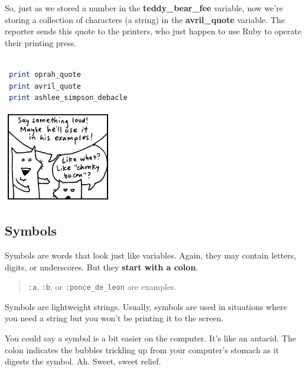 \documentclass[10pt,twoside]{report}
\begin{document}
So, just as we stored a number in the {\bf teddy\_bear\_fee} variable,
now we're storing a collection of characters (a string) in the {\bf
  avril\_quote} variable.  The reporter sends this quote to the
printers, who just happen to use Ruby to operate their printing press.


\begin{lstlisting}[basicstyle=\ttfamily\color{basiccolor},
    commentstyle = \ttfamily\color{commentcolor},
    keywordstyle=\ttfamily\color{keywordscolor},
    stringstyle=\color{stringcolor},
    language=Ruby,
    basicstyle=\small\ttfamily,
    showstringspaces=false,
  ]

 print oprah_quote
 print avril_quote
 print ashlee_simpson_debacle

\end{lstlisting}


	\includegraphics[width=0.3575\textwidth]{cache/9.png}




\subsection{Symbols}



Symbols are words that look just like variables.  Again, they may
contain letters, digits, or underscores.  But they {\bf start with a
  colon}.

\begin{quote}
\lstinline[breaklines=true]|:a|, \lstinline[breaklines=true]|:b|, or
\lstinline[breaklines=true]|:ponce_de_leon| are examples.\end{quote}


Symbols are lightweight strings.  Usually, symbols are used in
situations where you need a string but you won't be printing it to the
screen.

You could say a symbol is a bit easier on the computer.  It's like an
antacid.  The colon indicates the bubbles trickling up from your
computer's stomach as it digests the symbol.  Ah.  Sweet, sweet
relief.
\end{document}

